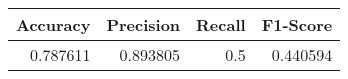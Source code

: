 \begin{tabular}{rrrr}
\toprule
 Accuracy &  Precision &  Recall &  F1-Score \\
\midrule
 0.787611 &   0.893805 &     0.5 &  0.440594 \\
\bottomrule
\end{tabular}
